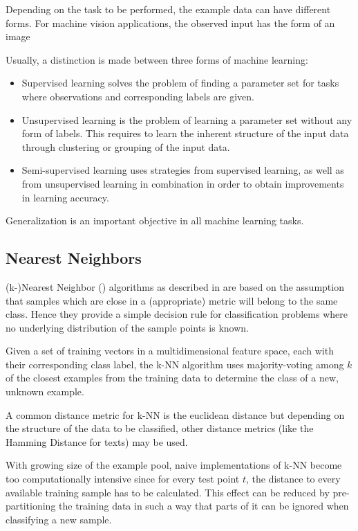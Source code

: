 		
		Depending on the task to be performed, the example data can have different forms. For machine vision applications, the observed input has the form of an image
		
		Usually, a distinction is made between three forms of machine learning:
		
		\begin{itemize}
			\item Supervised learning solves the problem of finding a parameter set for tasks where observations and corresponding labels are given. 
			
			\item Unsupervised learning is the problem of learning a parameter set without any form of labels. This requires to learn the inherent structure of the input data through clustering or grouping of the input data.
			
			\item Semi-supervised learning uses strategies from supervised learning, as well as from unsupervised learning in combination in order to obtain improvements in learning accuracy. 
			

		\end{itemize}
	
		Generalization is an important objective in all machine learning tasks. 
		
				\subsection{Nearest Neighbors}
		(k-)Nearest Neighbor () algorithms as described in \cite{Cover1967, Fix1952} are based on the assumption that samples which are close in a (appropriate) metric will belong to the same class. Hence they provide a simple decision rule for classification problems where no underlying distribution of the sample points is known. 
		
		Given a set of training vectors in a multidimensional feature space, each with their corresponding class label, the k-NN algorithm uses majority-voting among $k$ of the closest examples from the training data to determine the class of a new, unknown example.
		
		A common distance metric for k-NN is the euclidean distance but depending on the structure of the data to be classified, other distance metrics (like the Hamming Distance for texts) may be used.
		
		With growing size of the example pool, naive implementations of k-NN become too computationally intensive since for every test point $t$, the distance to every available training sample has to be calculated. This effect can be reduced by pre-partitioning the training data in such a way that parts of it can be ignored when classifying a new sample. 
		

